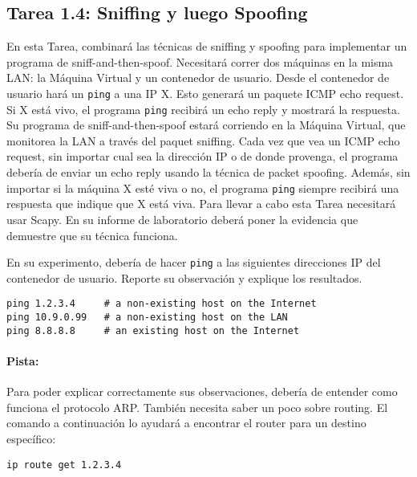 \subsection{Tarea 1.4: Sniffing y luego Spoofing}  

En esta Tarea, combinará las técnicas de sniffing y spoofing para implementar un programa de sniff-and-then-spoof.
Necesitará correr dos máquinas en la misma LAN: la Máquina Virtual y un contenedor de usuario. Desde el contenedor de usuario hará un {\tt ping} a una IP X. Esto generará un paquete ICMP echo request. Si X está vivo, el programa {\tt ping} recibirá un echo reply y mostrará la respuesta. Su programa de sniff-and-then-spoof estará corriendo en la Máquina Virtual, que monitorea la LAN a través del paquet sniffing. Cada vez que vea un ICMP echo request, sin importar cual sea la dirección IP o de donde provenga, el programa debería de enviar un echo reply usando la técnica de packet spoofing. Además, sin importar si la máquina X esté viva o no, el programa {\tt ping} siempre recibirá una respuesta que indique que X está viva. Para llevar a cabo esta Tarea necesitará usar Scapy. En su informe de laboratorio deberá poner la evidencia que demuestre que su técnica funciona.

En su experimento, debería de hacer \texttt{ping} a las siguientes direcciones IP del contenedor de usuario.
Reporte su observación y explique los resultados.

\begin{lstlisting}
ping 1.2.3.4     # a non-existing host on the Internet
ping 10.9.0.99   # a non-existing host on the LAN
ping 8.8.8.8     # an existing host on the Internet
\end{lstlisting}


\paragraph{Pista:} Para poder explicar correctamente sus observaciones, debería de entender como funciona el protocolo ARP. También necesita saber un poco sobre routing. El comando a continuación lo ayudará a encontrar el router para un destino específico:

\begin{lstlisting}
ip route get 1.2.3.4 
\end{lstlisting}
 
 


